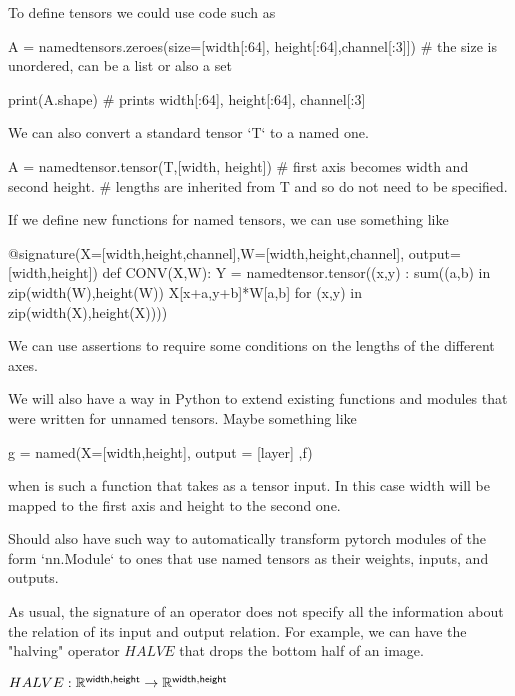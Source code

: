 \documentclass{article}
\begin{document}
To define tensors we could use code such as 

\begin{python}
A = namedtensors.zeroes(size=[width[:64], height[:64],channel[:3]])
# the size is unordered, can be a list or also a set

print(A.shape)
# prints { width[:64], height[:64], channel[:3] }
\end{python}

We can also convert a standard  tensor `T` to a named one.
 
\begin{python}
A = namedtensor.tensor(T,[width, height]) 
# first axis becomes width and second height.
# lengths are inherited from T and so do not need to be specified.
\end{python}


If we define new functions for named tensors, we can use something like

\begin{python}
  @signature(X=[width,height,channel],W=[width,height,channel], output=[width,height])
  def CONV(X,W):
      Y = namedtensor.tensor({(x,y) : sum((a,b) in zip(width(W),height(W)) X[x+a,y+b]*W[a,b]} for (x,y) in zip(width(X),height(X))))  
\end{python}
We can use assertions to require some conditions on the lengths of the different axes.



We will also have a way in Python to extend existing functions and modules that were written for unnamed tensors.
Maybe something like

\begin{python}
g = named(X=[width,height], output = [layer] ,f)
\end{python}
when  is such a function that takes  as a tensor input. In this case width will be mapped to the first axis and height to the second one. 

Should also have such way to automatically transform pytorch modules of the form `nn.Module` to ones that use named tensors as their weights, inputs, and outputs.

As usual, the signature of an operator does not specify all the information about the relation of its input and output relation. For example, we can have the "halving" operator $HALVE$ that drops the bottom half of an image.

$HALVE:\mathbb{R}^{\mathsf{width},\mathsf{height}} \rightarrow \mathbb{R}^{\mathsf{width},\mathsf{height}}$
\end{document}
